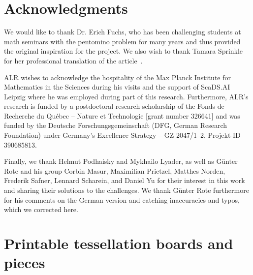 \documentclass{amsart}
\makeatletter
\theoremstyle{definition}
\theoremstyle{remark}
\newcommand{\addresseshere}{%
	\enddoc@text\let\enddoc@text\relax
}
\makeatother
\begin{document}
	
	
	\section*{Acknowledgments}
	We would like to thank Dr. Erich Fuchs, who has been challenging students at math seminars with the pentomino problem for many years and thus provided the original inspiration for the project. We also wish to thank Tamara Sprinkle for her professional translation of the article~\cite{Ta78}.
	
	ALR wishes to acknowledge the hospitality of the Max Planck Institute for Mathematics in the Sciences during his visits and the support of ScaDS.AI Leipzig where he was employed during part of this research. Furthermore, ALR's research is funded by a postdoctoral research scholarship of the Fonds de Recherche du Québec -- Nature et Technologie [grant number 326641] and was funded by the Deutsche Forschungsgemeinschaft (DFG, German Research Foundation) under Germany's Excellence Strategy -- GZ 2047/1--2, Projekt-ID 390685813.
	
	 Finally, we thank Helmut Podhaisky and Mykhailo Lyader, as well as Günter Rote and his group Corbin Masur, Maximilian Prietzel, Matthes Norden, Frederik Safner, Lennard Scharein, and Daniel Yu for their interest in this work and sharing their solutions to the challenges. We  thank Günter Rote furthermore for his comments on the German version and catching inaccuracies and typos, which we corrected here.
	
	\printbibliography
	\addresseshere
	
	\newpage
	
	\appendix
	
	
	
	
	\section{Printable tessellation boards and pieces}\label{app:fences}
	
\end{document}
